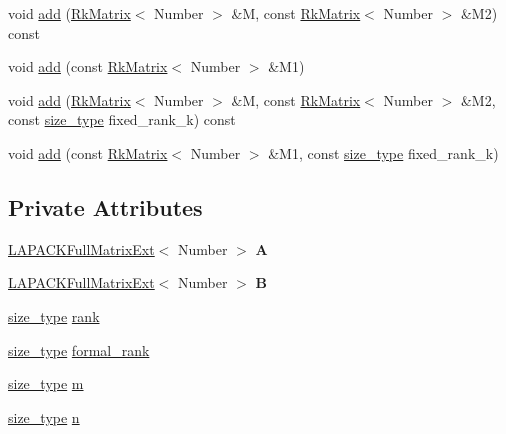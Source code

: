 \begin{DoxyCompactItemize}
\item 
void \hyperlink{classRkMatrix_a260584004c862292b4ae401cff236588}{add} (\hyperlink{classRkMatrix}{Rk\+Matrix}$<$ Number $>$ \&M, const \hyperlink{classRkMatrix}{Rk\+Matrix}$<$ Number $>$ \&M2) const
\item 
void \hyperlink{classRkMatrix_a8793188eb93def0030ae90e8f5898813}{add} (const \hyperlink{classRkMatrix}{Rk\+Matrix}$<$ Number $>$ \&M1)
\item 
void \hyperlink{classRkMatrix_ad8668d42978011b3e65d0381bfb068d5}{add} (\hyperlink{classRkMatrix}{Rk\+Matrix}$<$ Number $>$ \&M, const \hyperlink{classRkMatrix}{Rk\+Matrix}$<$ Number $>$ \&M2, const \hyperlink{classRkMatrix_add060bfc3a4cc77f858c3d6dd58cadd5}{size\+\_\+type} fixed\+\_\+rank\+\_\+k) const
\item 
void \hyperlink{classRkMatrix_a1f51eac54ddb43c0670a72da62bc1e55}{add} (const \hyperlink{classRkMatrix}{Rk\+Matrix}$<$ Number $>$ \&M1, const \hyperlink{classRkMatrix_add060bfc3a4cc77f858c3d6dd58cadd5}{size\+\_\+type} fixed\+\_\+rank\+\_\+k)
\end{DoxyCompactItemize}
\subsection*{Private Attributes}
\begin{DoxyCompactItemize}
\item 
\mbox{\label{classRkMatrix_a7bad017da4b56bfe703ac9086fd97d99}} 
\hyperlink{classLAPACKFullMatrixExt}{L\+A\+P\+A\+C\+K\+Full\+Matrix\+Ext}$<$ Number $>$ {\bfseries A}
\item 
\mbox{\label{classRkMatrix_a04f480fcd16ab9918271c7ba199df523}} 
\hyperlink{classLAPACKFullMatrixExt}{L\+A\+P\+A\+C\+K\+Full\+Matrix\+Ext}$<$ Number $>$ {\bfseries B}
\item 
\hyperlink{classRkMatrix_add060bfc3a4cc77f858c3d6dd58cadd5}{size\+\_\+type} \hyperlink{classRkMatrix_aa9e60bb24bbe3ab1750f970f296d8256}{rank}
\item 
\hyperlink{classRkMatrix_add060bfc3a4cc77f858c3d6dd58cadd5}{size\+\_\+type} \hyperlink{classRkMatrix_a7e4a8f0500daba627665c6a5ed8888d9}{formal\+\_\+rank}
\item 
\hyperlink{classRkMatrix_add060bfc3a4cc77f858c3d6dd58cadd5}{size\+\_\+type} \hyperlink{classRkMatrix_a8ca8898bcfedeee135437833f83b144c}{m}
\item 
\hyperlink{classRkMatrix_add060bfc3a4cc77f858c3d6dd58cadd5}{size\+\_\+type} \hyperlink{classRkMatrix_a06d3b6636bb423c391c66e4ccc722687}{n}
\end{DoxyCompactItemize}

